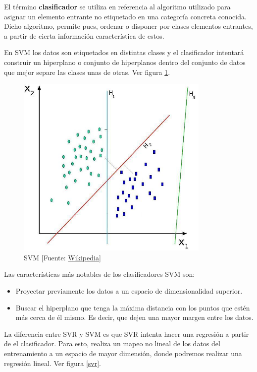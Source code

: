 	El término \textbf{clasificador} se utiliza en referencia al algoritmo utilizado para asignar un elemento entrante no etiquetado en una categoría concreta conocida. Dicho algoritmo, permite pues, ordenar o disponer por clases elementos entrantes, a partir de cierta información característica de estos.

	En SVM los datos son etiquetados en distintas clases y el clasificador intentará construir un hiperplano o conjunto de hiperplanos dentro del conjunto de datos que mejor separe las clases unas de otras. Ver figura \ref{svm}.

	\begin{figure}[htb]
		
		\begin{center}
			\includegraphics[height=3.5in]{figures/svm.jpg}
			\caption{SVM [Fuente: \href{www.wikipedia.org}{Wikipedia}]}
		\end{center}
		\label{svm}
	\end{figure}

	Las características más notables de los clasificadores SVM son:
	\begin{itemize}
		\item Proyectar previamente los datos a un espacio de dimensionalidad superior.
		\item Buscar el hiperplano que tenga la máxima distancia con los puntos que estén más cerca de él mismo. Es decir, que dejen una mayor margen entre los datos.
	\end{itemize}

	La diferencia entre SVR y SVM es que SVR intenta hacer una regresión a partir de el clasificador. Para esto, realiza un mapeo no lineal de los datos del entrenamiento a un espacio de mayor dimensión, donde podremos realizar una regresión lineal. Ver figura \ref{svr}.

